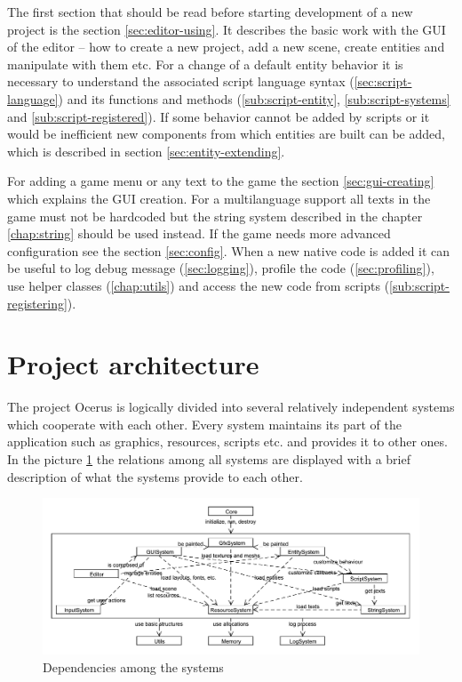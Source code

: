 \documentclass[a4paper, 12pt]{report}
\begin{document}
The first section that should be read before starting development of a new project is the section \ref{sec:editor-using}. It describes the basic work with the GUI of the editor -- how to create a new project, add a new scene, create entities and manipulate with them etc. For a change of a default entity behavior it is necessary to understand the associated script language syntax (\ref{sec:script-language}) and its functions and methods (\ref{sub:script-entity}, \ref{sub:script-systems} and \ref{sub:script-registered}). If some behavior cannot be added by scripts or it would be inefficient new components from which entities are built can be added, which is described in section \ref{sec:entity-extending}.

For adding a game menu or any text to the game the section \ref{sec:gui-creating} which explains the GUI creation. For a multilanguage support all texts in the game must not be hardcoded but the string system described in the chapter \ref{chap:string} should be used instead. If the game needs more advanced configuration see the section \ref{sec:config}. When a new native code is added it can be useful to log debug message (\ref{sec:logging}), profile the code (\ref{sec:profiling}), use helper classes (\ref{chap:utils}) and access the new code from scripts (\ref{sub:script-registering}).

\section{Project architecture}

The project Ocerus is logically divided into several relatively independent systems which cooperate with each other. Every system maintains its part of the application such as graphics, resources, scripts etc. and provides it to other ones. In the picture \ref{fig:system-connection} the relations among all systems are displayed with a brief description of what the systems provide to each other.

\begin{figure}[htbp]
	\centering
		\includegraphics[width=1\textwidth]{SystemConnection.pdf}
	\caption{Dependencies among the systems}
	\label{fig:system-connection}
\end{figure}
\end{document}
